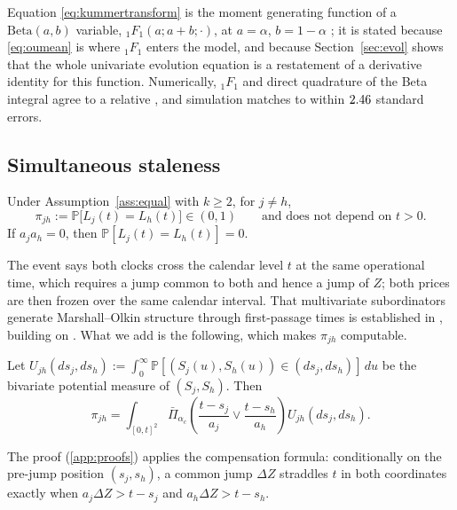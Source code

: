 \documentclass{ws-ijtaf}
\newcommand{\PP}{\mathbb{P}}
\newcommand{\Bet}{\mathrm{Beta}}
\newcommand{\Fone}{{}_1F_1}
\begin{document}
Equation \eqref{eq:kummertransform} is the moment generating function of a
$\Bet(a,b)$ variable, $\Fone(a;a+b;\cdot)$, at $a=\alpha$, $b=1-\alpha$
\citep[Sec.~13]{nist10}; it is stated because \eqref{eq:oumean} is where $\Fone$
enters the model, and because Section~\ref{sec:evol} shows that the whole
univariate evolution equation is a restatement of a derivative identity for this
function. Numerically, $\Fone$ and direct quadrature of the Beta integral agree
to a relative \kummerMaxRel{}, and simulation matches to within
$2.46{}$ standard errors.

\subsection{Simultaneous staleness}\label{sec:atom}

\begin{proposition}\label{prop:atom}
Under Assumption~\ref{ass:equal} with $k\ge2$, for $j\ne h$,
\begin{equation}
\pi_{jh} := \PP\big[L_j(t)=L_h(t)\big] \in (0,1)
\qquad\text{and does not depend on } t>0 .
\end{equation}
If $a_j a_h = 0$, then $\PP[L_j(t)=L_h(t)]=0$.
\end{proposition}

The event says both clocks cross the calendar level $t$ at the same operational
time, which requires a jump common to both and hence a jump of $Z$; both prices
are then frozen over the same calendar interval. That multivariate subordinators
generate Marshall--Olkin structure through first-passage times is established in
\citet{sun17}, building on \citet{mar67}. What we add is the following, which
makes $\pi_{jh}$ computable.

\begin{theorem}\label{thm:atomformula}
Let $U_{jh}(ds_j,ds_h) := \int_0^\infty \PP[(S_j(u),S_h(u))\in (ds_j,ds_h)]\,du$
be the bivariate potential measure of $(S_j,S_h)$. Then
\begin{equation}
\pi_{jh}
= \int_{[0,t]^2}
\bar\Pi_{\alpha_c}\!\left(
\frac{t-s_j}{a_j} \vee \frac{t-s_h}{a_h}
\right) U_{jh}(ds_j,ds_h).
\label{eq:atomformula}
\end{equation}
\end{theorem}

The proof (\ref{app:proofs}) applies the compensation formula:
conditionally on the pre-jump position $(s_j,s_h)$, a common jump $\Delta Z$
straddles $t$ in both coordinates exactly when $a_j \Delta Z > t-s_j$ and
$a_h \Delta Z > t-s_h$.
\end{document}
